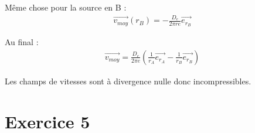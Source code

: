 \documentclass{report}
\begin{document}
Même chose pour la source en B :
\begin{align*}
	\vec{v_{moy}}(r_B) = -\frac{D_e}{2\pi r e}\vec{e_{r_B}}
\end{align*}

Au final : 
\begin{align*}
	\vec{v_{moy}} = \frac{D_e}{2\pi e}\left( \frac{1}{r_A}\vec{e_{r_A}} - \frac{1}{r_B}\vec{e_{r_B}}\right) 
\end{align*}

Les champs de vitesses sont à divergence nulle donc incompressibles.

\newpage

\section*{Exercice 5}
\end{document}
